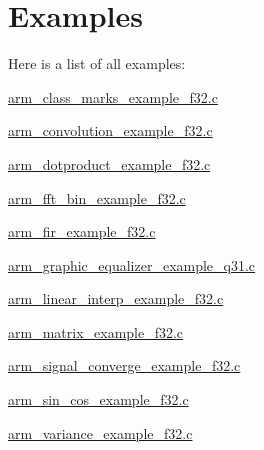 \section{Examples}
Here is a list of all examples\-:\begin{DoxyCompactItemize}
\item 
\hyperlink{arm_class_marks_example_f32_8c-example}{arm\-\_\-class\-\_\-marks\-\_\-example\-\_\-f32.\-c}
\item 
\hyperlink{arm_convolution_example_f32_8c-example}{arm\-\_\-convolution\-\_\-example\-\_\-f32.\-c}
\item 
\hyperlink{arm_dotproduct_example_f32_8c-example}{arm\-\_\-dotproduct\-\_\-example\-\_\-f32.\-c}
\item 
\hyperlink{arm_fft_bin_example_f32_8c-example}{arm\-\_\-fft\-\_\-bin\-\_\-example\-\_\-f32.\-c}
\item 
\hyperlink{arm_fir_example_f32_8c-example}{arm\-\_\-fir\-\_\-example\-\_\-f32.\-c}
\item 
\hyperlink{arm_graphic_equalizer_example_q31_8c-example}{arm\-\_\-graphic\-\_\-equalizer\-\_\-example\-\_\-q31.\-c}
\item 
\hyperlink{arm_linear_interp_example_f32_8c-example}{arm\-\_\-linear\-\_\-interp\-\_\-example\-\_\-f32.\-c}
\item 
\hyperlink{arm_matrix_example_f32_8c-example}{arm\-\_\-matrix\-\_\-example\-\_\-f32.\-c}
\item 
\hyperlink{arm_signal_converge_example_f32_8c-example}{arm\-\_\-signal\-\_\-converge\-\_\-example\-\_\-f32.\-c}
\item 
\hyperlink{arm_sin_cos_example_f32_8c-example}{arm\-\_\-sin\-\_\-cos\-\_\-example\-\_\-f32.\-c}
\item 
\hyperlink{arm_variance_example_f32_8c-example}{arm\-\_\-variance\-\_\-example\-\_\-f32.\-c}
\end{DoxyCompactItemize}
